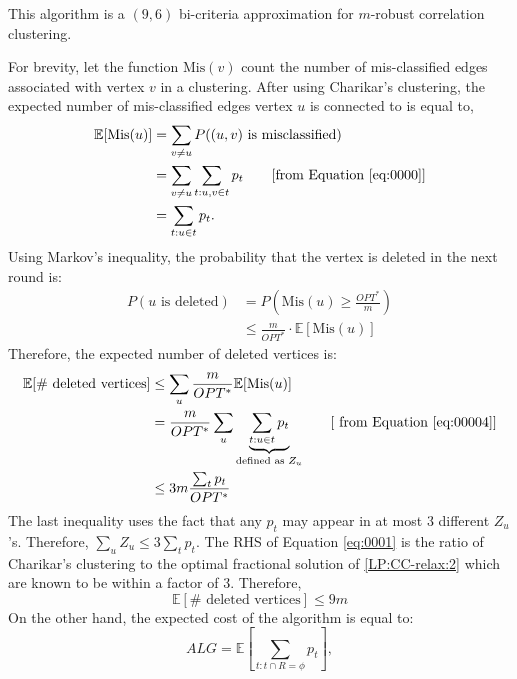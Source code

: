 \begin{theorem}
This algorithm is a $(9,6)$ bi-criteria approximation for $m$-robust correlation clustering.
\end{theorem}
\noindent For brevity, let the function $\mathrm{Mis} (v)$ count the number of mis-classified edges associated with vertex $v$ in a clustering. After using Charikar's clustering, the expected number of mis-classified edges vertex $u$ is connected to is equal to, 
\begin{align} 
    \mathbb{E} [\mathrm{Mis} (u)] &= \sum_{v \ne u} P( (u,v) \text{ is misclassified})\\
    &= \sum_{v \ne u} \sum_{t : u,v \in t} p_t \qquad [\text{from Equation } \eqref{eq:0000}] \nonumber\\
    &= \sum_{t : u \in t} p_t. \label{eq:00004}
\end{align}
Using Markov's inequality, the probability that the vertex is deleted in the next round is:
\begin{align*}
    P (u \text{ is deleted}) &= P \left( \mathrm{Mis} (u) \ge \frac{OPT^*}{m} \right) \\
    &\le \frac{m}{OPT^*} \cdot \mathbb{E} [\mathrm{Mis} (u)]
\end{align*}
Therefore, the expected number of deleted vertices is:
\begin{align}
    \mathbb{E} [\# \text{ deleted vertices}] &\le \sum_u \frac{m}{OPT^*} \mathbb{E} [\mathrm{Mis} (u)] \nonumber\\
    &= \frac{m}{OPT^*} \sum_u \underbrace{\sum_{t : u \in t} p_t}_{\text{defined as } Z_u} \qquad [\text{ from Equation } \eqref{eq:00004} ] \nonumber\\
    &\le 3m \frac{\sum_t p_t}{OPT^*} \label{eq:0001}
\end{align}
The last inequality uses the fact that any $p_t$ may appear in at most $3$ different $Z_u$'s. Therefore, $\sum_u Z_u \le 3\sum_t p_t $. The RHS of Equation \eqref{eq:0001} is the ratio of Charikar's clustering to the optimal fractional solution of \ref{LP:CC-relax:2} which are known to be within a factor of $3$. Therefore,
\begin{equation*}
    \mathbb{E} [\# \text{ deleted vertices}] \le 9m
\end{equation*}
On the other hand, the expected cost of the algorithm is equal to:
\begin{equation} \label{eq:0003}
    ALG = \mathbb{E} \left[ \sum_{t : t \cap R = \phi} p_t \right],
\end{equation}
